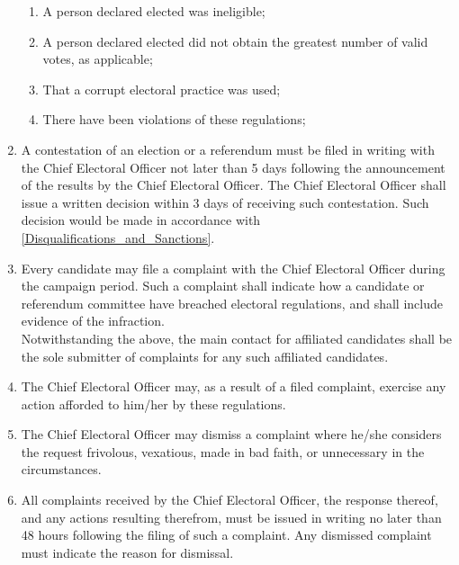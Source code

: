 \documentclass[oneside]{book}
\begin{document}
\begin{enumerate}
\begin{enumerate}
\item A person declared elected was ineligible; 
\item A person declared elected did not obtain the greatest number of valid
votes, as applicable; 
\item That a corrupt electoral practice was used; 
\item There have been violations of these regulations; 
\end{enumerate}
\item A contestation of an election or a referendum must be filed in writing
with the Chief Electoral Officer not later than 5 days following the
announcement of the results by the Chief Electoral Officer. The Chief
Electoral Officer shall issue a written decision within 3 days of
receiving such contestation. Such decision would be made in accordance
with \autoref{Disqualifications_and_Sanctions}.
\item Every candidate may file a complaint with the Chief Electoral Officer
during the campaign period. Such a complaint shall indicate how a
candidate or referendum committee have breached electoral regulations,
and shall include evidence of the infraction.\\
Notwithstanding the above, the main contact for affiliated candidates
shall be the sole submitter of complaints for any such affiliated
candidates.
\item The Chief Electoral Officer may, as a result of a filed complaint,
exercise any action afforded to him/her by these regulations.
\item The Chief Electoral Officer may dismiss a complaint where he/she considers
the request frivolous, vexatious, made in bad faith, or unnecessary
in the circumstances.
\item All complaints received by the Chief Electoral Officer, the response
thereof, and any actions resulting therefrom, must be issued in writing
no later than 48 hours following the filing of such a complaint. Any
dismissed complaint must indicate the reason for dismissal.


\end{enumerate}
\end{document}
